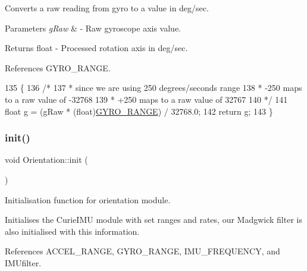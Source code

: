 Converts a raw reading from gyro to a value in deg/sec. 


\begin{DoxyParams}{Parameters}
{\em g\+Raw} & -\/ Raw gyroscope axis value. \\
\hline
\end{DoxyParams}
\begin{DoxyReturn}{Returns}
float -\/ Processed rotation axis in deg/sec. 
\end{DoxyReturn}


References G\+Y\+R\+O\+\_\+\+R\+A\+N\+GE.


\begin{DoxyCode}
135 \{
136   \textcolor{comment}{/*}
137 \textcolor{comment}{   * since we are using 250 degrees/seconds range}
138 \textcolor{comment}{   * -250 maps to a raw value of -32768}
139 \textcolor{comment}{   * +250 maps to a raw value of 32767}
140 \textcolor{comment}{   */}
141   \textcolor{keywordtype}{float} g = (gRaw * (float)\hyperlink{_orientation_8cpp_af9a0775d43604d7410e3da3dbc90925a}{GYRO\_RANGE}) / 32768.0;
142   \textcolor{keywordflow}{return} g;
143 \}
\end{DoxyCode}
\mbox{\label{class_logging_device_1_1_orientation_a317461c5c8afa8c3abf56847d4544728}} 
\subsubsection{\texorpdfstring{init()}{init()}}
{\footnotesize\ttfamily void Orientation\+::init (\begin{DoxyParamCaption}{ }\end{DoxyParamCaption})}



Initialisation function for orientation module. 

Initialises the Curie\+I\+MU module with set ranges and rates, our Madgwick filter is also initialised with this information. 

References A\+C\+C\+E\+L\+\_\+\+R\+A\+N\+GE, G\+Y\+R\+O\+\_\+\+R\+A\+N\+GE, I\+M\+U\+\_\+\+F\+R\+E\+Q\+U\+E\+N\+CY, and I\+M\+Ufilter.


